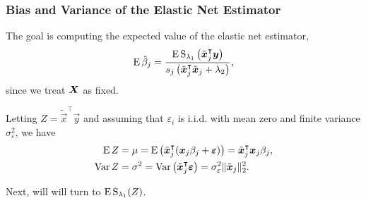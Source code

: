 \documentclass[10pt]{beamer}
\begin{document}
\begin{frame}[c]
  \frametitle{Bias and Variance of the Elastic Net Estimator}

  The goal is computing the expected value of the elastic net estimator,
  \[
    \operatorname{E} \hat\beta_j = \frac{\operatorname{E} \operatorname{S}_{\lambda_1}\left(\tilde{\boldsymbol{x}}_j^\intercal \boldsymbol{y}\right)}{s_j\left(\tilde{\boldsymbol{x}}_j^\intercal \tilde{\boldsymbol{x}}_j + \lambda_2\right)},
  \]
  since we treat \(\boldsymbol{X}\) as fixed.

  \bigskip\pause

  Letting \(Z = \tilde{\vec{x}}^\intercal \vec{y}\) and assuming that \(\varepsilon_i\) is
  i.i.d. with mean zero and finite variance \(\sigma_\varepsilon^2\), we have
  \begin{align*}
    \operatorname{E} Z   & = \mu = \operatorname{E} \left( \tilde{\boldsymbol{x}}_j^\intercal (\boldsymbol{x}_j\beta_j + \boldsymbol{\varepsilon}) \right)  = \tilde{\boldsymbol{x}}_j^\intercal\boldsymbol{x}_j \beta_j,  \\
    \operatorname{Var} Z & = \sigma^2 = \operatorname{Var}\left(\tilde{\boldsymbol{x}}_j ^\intercal \boldsymbol{\varepsilon}\right) = \sigma_\varepsilon^2 \lVert \tilde{\boldsymbol{x}}_j\rVert_2^2.
  \end{align*}

  \bigskip

  Next, will will turn to \(\operatorname{E} \operatorname{S}_{\lambda_1}(Z)\).
\end{frame}
\end{document}
